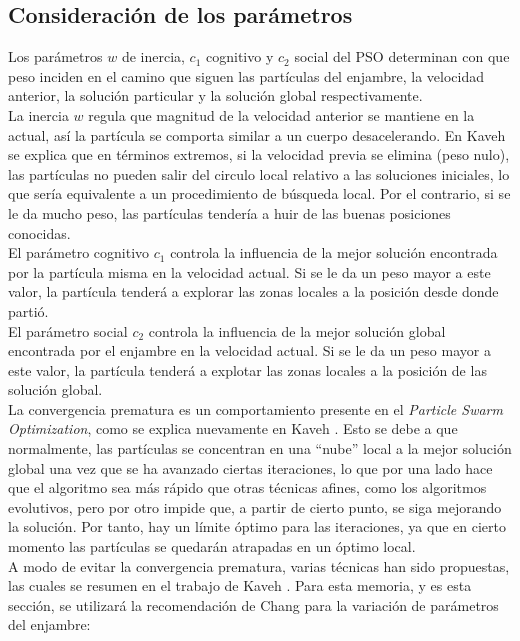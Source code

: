 \subsection{Consideración de los parámetros}
Los parámetros $w$ de inercia, $c_1$ cognitivo y $c_2$ social del PSO determinan con que peso inciden en el camino que siguen las partículas del enjambre, la velocidad anterior, la solución particular y la solución global respectivamente.\\ 
La inercia $w$ regula que magnitud de la velocidad anterior se mantiene en la actual, así la partícula se comporta similar a un cuerpo desacelerando. En Kaveh \cite{Psoexplain14} se explica que en términos extremos, si la velocidad previa se elimina (peso nulo), las partículas no pueden salir del circulo local relativo a las soluciones iniciales, lo que sería equivalente a un procedimiento de búsqueda local.  Por el contrario, si se le da mucho peso, las partículas tendería a huir de las buenas posiciones conocidas.\\
El parámetro cognitivo $c_1$ controla la influencia de la mejor solución encontrada por la partícula misma en la velocidad actual. Si se le da un peso mayor a este valor, la partícula tenderá a explorar las zonas locales a la posición desde donde partió.\\
El parámetro social $c_2$ controla la influencia de la mejor solución global encontrada por el enjambre en la velocidad actual. Si se le da un peso mayor a este valor, la partícula tenderá a explotar las zonas locales a la posición de las solución global.\\
La convergencia prematura es un comportamiento presente en el \emph{Particle Swarm Optimization}, como se explica nuevamente en Kaveh \cite{Psoexplain14}. Esto se debe a que normalmente, las partículas se concentran en una ``nube'' local a la mejor solución global una vez que se ha avanzado ciertas iteraciones, lo que por una lado hace que el algoritmo sea más rápido que otras técnicas afines, como los algoritmos evolutivos, pero por otro impide que, a partir de cierto punto, se siga mejorando la solución. Por tanto, hay un límite óptimo para las iteraciones, ya que en cierto momento las partículas se quedarán atrapadas en un óptimo local.\\
A modo de evitar la convergencia prematura, varias técnicas han sido propuestas, las cuales se resumen en el trabajo de Kaveh \cite{Psoexplain14}. Para esta memoria, y es esta sección, se utilizará la recomendación de Chang \cite{Chang10_2} para la variación de parámetros del enjambre:

